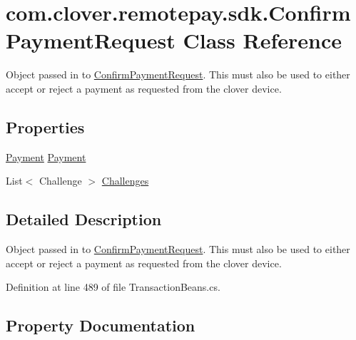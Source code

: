 \hypertarget{classcom_1_1clover_1_1remotepay_1_1sdk_1_1_confirm_payment_request}{}\section{com.\+clover.\+remotepay.\+sdk.\+Confirm\+Payment\+Request Class Reference}
\label{classcom_1_1clover_1_1remotepay_1_1sdk_1_1_confirm_payment_request}


Object passed in to \hyperlink{classcom_1_1clover_1_1remotepay_1_1sdk_1_1_confirm_payment_request}{Confirm\+Payment\+Request}. This must also be used to either accept or reject a payment as requested from the clover device.  


\subsection*{Properties}
\begin{DoxyCompactItemize}
\item 
\hyperlink{classcom_1_1clover_1_1sdk_1_1v3_1_1payments_1_1_payment}{Payment} \hyperlink{classcom_1_1clover_1_1remotepay_1_1sdk_1_1_confirm_payment_request_ac37c417f349cc5ec5222a8d46ca53a1f}{Payment}
\item 
List$<$ Challenge $>$ \hyperlink{classcom_1_1clover_1_1remotepay_1_1sdk_1_1_confirm_payment_request_a6c6a13c89a0eee65abc066295e4ccecd}{Challenges}
\end{DoxyCompactItemize}


\subsection{Detailed Description}
Object passed in to \hyperlink{classcom_1_1clover_1_1remotepay_1_1sdk_1_1_confirm_payment_request}{Confirm\+Payment\+Request}. This must also be used to either accept or reject a payment as requested from the clover device. 



Definition at line 489 of file Transaction\+Beans.\+cs.



\subsection{Property Documentation}
\mbox{\label{classcom_1_1clover_1_1remotepay_1_1sdk_1_1_confirm_payment_request_a6c6a13c89a0eee65abc066295e4ccecd}} 
